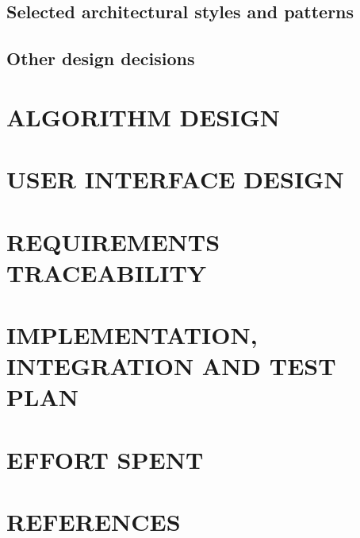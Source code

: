 \documentclass[11pt]{report}
\begin{document}
		\section{Selected architectural styles and patterns}
		\label{sect:Selected architectural styles and patterns}
			
		
		\section{Other design decisions}
		\label{sect:Other design decisions}
			
	\chapter{ALGORITHM DESIGN}
	\label{ch:ALGORITHM DESIGN}
			
	\chapter{USER INTERFACE DESIGN}
	\label{ch:USER INTERFACE DESIGN}
	
	\chapter{REQUIREMENTS TRACEABILITY}
	\label{ch:REQUIREMENTS TRACEABILITY}
			
	\chapter{IMPLEMENTATION, INTEGRATION AND TEST PLAN}
	\label{ch:IMPLEMENTATION, INTEGRATION AND TEST PLAN}
			
	\chapter{EFFORT SPENT}
	\label{ch:EFFORT SPENT}
	\chapter{REFERENCES}
	\label{ch:REFERENCES}
		
\end{document}
